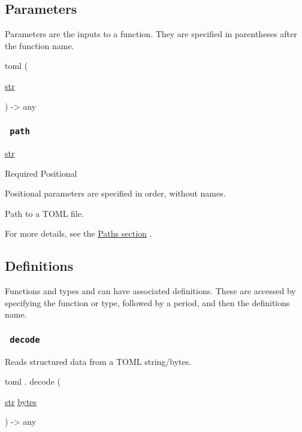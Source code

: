 \subsection{\texorpdfstring{{ Parameters
}}{ Parameters }}\label{parameters}

\label{parameters-tooltip}
Parameters are the inputs to a function. They are specified in
parentheses after the function name.

{ toml } (

{ \href{/docs/reference/foundations/str/}{str} }

) -\textgreater{} { any }

\subsubsection{\texorpdfstring{\texttt{\ path\ }}{ path }}\label{parameters-path}

\href{/docs/reference/foundations/str/}{str}

{Required} {{ Positional }}

\label{parameters-path-positional-tooltip}
Positional parameters are specified in order, without names.

Path to a TOML file.

For more details, see the \href{/docs/reference/syntax/\#paths}{Paths
section} .

\subsection{\texorpdfstring{{ Definitions
}}{ Definitions }}\label{definitions}

\label{definitions-tooltip}
Functions and types and can have associated definitions. These are
accessed by specifying the function or type, followed by a period, and
then the definition\textquotesingle s name.

\subsubsection{\texorpdfstring{\texttt{\ decode\ }}{ decode }}\label{definitions-decode}

Reads structured data from a TOML string/bytes.

toml { . } { decode } (

{ \href{/docs/reference/foundations/str/}{str}
\href{/docs/reference/foundations/bytes/}{bytes} }

) -\textgreater{} { any }

